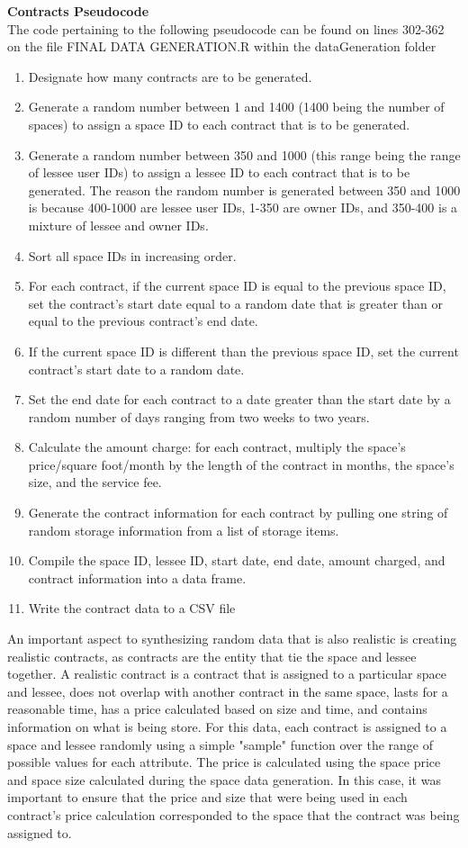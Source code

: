 \textbf{Contracts Pseudocode}
\\The code pertaining to the following pseudocode can be found on lines 302-362 on the file FINAL DATA GENERATION.R within the dataGeneration folder
\begin{enumerate}
\item Designate how many contracts are to be generated.
\item Generate a random number between 1 and 1400 (1400 being the number of spaces) to assign a space ID to each contract that is to be generated. 
\item Generate a random number between 350 and 1000 (this range being the range of lessee user IDs) to assign a lessee ID to each contract that is to be generated. The reason the random number is generated between 350 and 1000 is because 400-1000 are lessee user IDs, 1-350 are owner IDs, and 350-400 is a mixture of lessee and owner IDs.
\item Sort all space IDs in increasing order.
\item For each contract, if the current space ID is equal to the previous space ID, set the contract's start date equal to a random date that is greater than or equal to the previous contract's end date.
\item If the current space ID is different than the previous space ID, set the current contract's start date to a random date.
\item Set the end date for each contract to a date greater than the start date by a random number of days ranging from two weeks to two years.
\item Calculate the amount charge: for each contract, multiply the space's price/square foot/month by the length of the contract in months, the space's size, and the service fee.
\item Generate the contract information for each contract by pulling one string of random storage information from a list of storage items.
\item Compile the space ID, lessee ID, start date, end date, amount charged, and contract information into a data frame.
\item Write the contract data to a CSV file
\end{enumerate}
An important aspect to synthesizing random data that is also realistic is creating realistic contracts, as contracts are the entity that tie the space and lessee together. A realistic contract is a contract that is assigned to a particular space and lessee, does not overlap with another contract in the same space, lasts for a reasonable time, has a price calculated based on size and time, and contains information on what is being store. For this data, each contract is assigned to a space and lessee randomly using a simple "sample" function over the range of possible values for each attribute. The price is calculated using the space price and space size calculated during the space data generation. In this case, it was important to ensure that the price and size that were being used in each contract's price calculation corresponded to the space that the contract was being assigned to.\\

